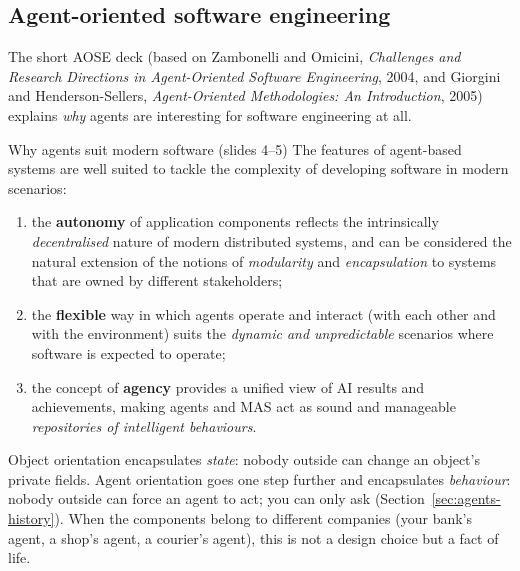\subsection{Agent-oriented software engineering}
\label{sec:aose}

The short AOSE deck (based on Zambonelli and Omicini, \emph{Challenges and Research
Directions in Agent-Oriented Software Engineering}, 2004, and Giorgini and
Henderson-Sellers, \emph{Agent-Oriented Methodologies: An Introduction}, 2005) explains
\emph{why} agents are interesting for software engineering at all.

\begin{nbfact}{Why agents suit modern software (slides 4--5)}
The features of agent-based systems are well suited to tackle the complexity of developing
software in modern scenarios:
\begin{enumerate}
  \item the \textbf{autonomy} of application components reflects the intrinsically
        \emph{decentralised} nature of modern distributed systems, and can be considered the
        natural extension of the notions of \emph{modularity} and \emph{encapsulation} to
        systems that are owned by different stakeholders;
  \item the \textbf{flexible} way in which agents operate and interact (with each other and
        with the environment) suits the \emph{dynamic and unpredictable} scenarios where
        software is expected to operate;
  \item the concept of \textbf{agency} provides a unified view of AI results and
        achievements, making agents and MAS act as sound and manageable
        \emph{repositories of intelligent behaviours}.
\end{enumerate}
\end{nbfact}

\begin{nbintuition}
Object orientation encapsulates \emph{state}: nobody outside can change an object's private
fields. Agent orientation goes one step further and encapsulates \emph{behaviour}: nobody
outside can force an agent to act; you can only ask (Section~\ref{sec:agents-history}). When
the components belong to different companies (your bank's agent, a shop's agent, a
courier's agent), this is not a design choice but a fact of life.
\end{nbintuition}

